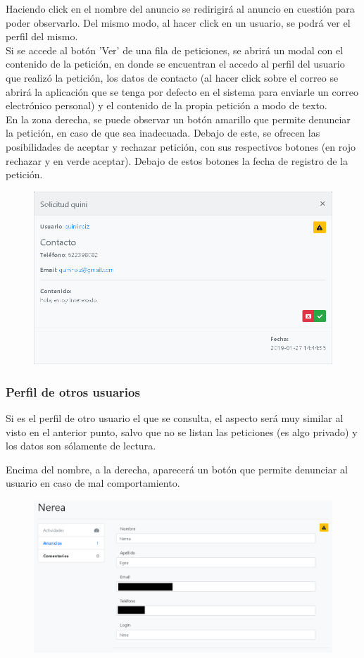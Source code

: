 Haciendo click en el nombre del anuncio se redirigir\'{a} al anuncio en cuesti\'{o}n para poder observarlo. Del mismo modo, al hacer click en un usuario, se podr\'{a} ver el perfil del mismo. \\


Si se accede al bot\'{o}n 'Ver' de una fila de peticiones, se abrir\'{a} un modal con el contenido de la petici\'{o}n, en donde se encuentran el accedo al perfil del usuario que realiz\'{o} la petici\'{o}n, los datos de contacto (al hacer click sobre el correo se abrir\'{a} la aplicaci\'{o}n que se tenga por defecto en el sistema para enviarle un correo electr\'{o}nico personal) y el contenido de la propia petici\'{o}n a modo de texto. \\

En la zona derecha, se puede observar un bot\'{o}n amarillo que permite denunciar la petici\'{o}n, en caso de que sea inadecuada. Debajo de este, se ofrecen las posibilidades de aceptar y rechazar petici\'{o}n, con sus respectivos botones (en rojo rechazar y en verde aceptar). Debajo de estos botones la fecha de registro de la petici\'{o}n.

\begin{figure}[h!]
\centering
\includegraphics[width=.6\textwidth]{Img/ManualUsuario/USER_REQUEST_READ.png}
\end{figure}

\subsubsection{Perfil de otros usuarios}
Si es el perfil de otro usuario el que se consulta, el aspecto ser\'{a} muy similar al visto en el anterior punto, salvo que no se listan las peticiones (es algo privado) y los datos son s\'{o}lamente de lectura. 

Encima del nombre, a la derecha, aparecer\'{a} un bot\'{o}n que permite denunciar al usuario en caso de mal comportamiento. \\

\begin{figure}[h!]
\centering
\includegraphics[width=.7\textwidth]{Img/ManualUsuario/PERFIL_OTHER.png}
\end{figure}

